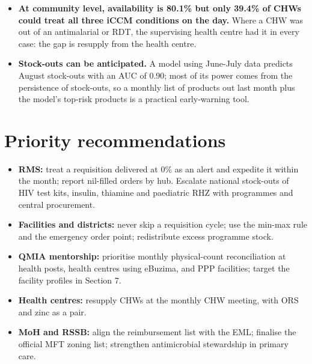 \documentclass[10pt,a4paper]{report}
\begin{document}
\begin{itemize}
\item \textbf{At community level, availability is 80.1\% but only 39.4\% of CHWs could treat all three iCCM conditions on the day.} Where a CHW was out of an antimalarial or RDT, the supervising health centre had it in every case: the gap is resupply from the health centre.
\item \textbf{Stock-outs can be anticipated.} A model using June-July data predicts August stock-outs with an AUC of 0.90; most of its power comes from the persistence of stock-outs, so a monthly list of products out last month plus the model's top-risk products is a practical early-warning tool.
\end{itemize}
\section*{Priority recommendations}
\begin{itemize}\item \textbf{RMS:} treat a requisition delivered at 0\% as an alert and expedite it within the month; report nil-filled orders by hub. Escalate national stock-outs of HIV test kits, insulin, thiamine and paediatric RHZ with programmes and central procurement.
\item \textbf{Facilities and districts:} never skip a requisition cycle; use the min-max rule and the emergency order point; redistribute excess programme stock.
\item \textbf{QMIA mentorship:} prioritise monthly physical-count reconciliation at health posts, health centres using eBuzima, and PPP facilities; target the facility profiles in Section 7.
\item \textbf{Health centres:} resupply CHWs at the monthly CHW meeting, with ORS and zinc as a pair.
\item \textbf{MoH and RSSB:} align the reimbursement list with the EML; finalise the official MFT zoning list; strengthen antimicrobial stewardship in primary care.
\end{itemize}
\end{document}
